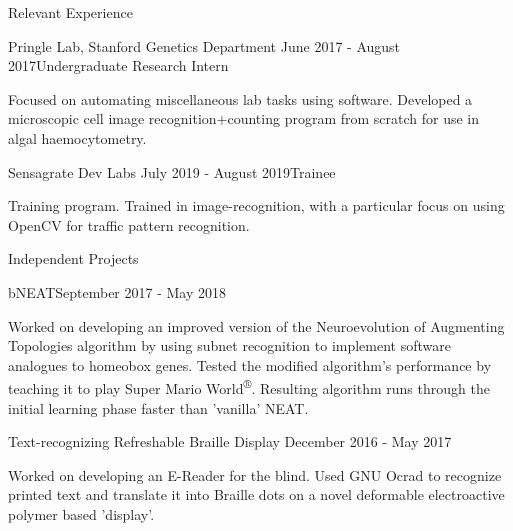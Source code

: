 \documentclass{resume} %
\begin{document}
\begin{resumeSection}{Relevant Experience}

\begin{resumeSubsection}{Pringle Lab, Stanford Genetics Department}
	{June 2017 - August 2017}{Undergraduate Research Intern}{}
\item Focused on automating miscellaneous lab tasks using software. Developed a 
	microscopic cell image recognition+counting program from scratch for
	use in algal haemocytometry.
\end{resumeSubsection}
\begin{resumeSubsection}{Sensagrate Dev Labs}
	{July 2019 - August 2019}{Trainee}{}
\item Training program. Trained in image-recognition, with a particular focus
	on using OpenCV for traffic pattern recognition.
\end{resumeSubsection}

\end{resumeSection}


\begin{resumeSection}{Independent Projects} \itemsep -2pt

\begin{resumeSubsection}{bNEAT}{September 2017 - May 2018}{}{}
\item Worked on developing an improved version of the Neuroevolution of
	Augmenting Topologies algorithm by using subnet recognition to
	implement software analogues to homeobox genes. Tested the modified
	algorithm's performance by teaching it to play Super Mario
	World\textsuperscript{®}. Resulting algorithm runs through the initial
	learning phase faster than 'vanilla' NEAT.
\end{resumeSubsection}
\begin{resumeSubsection}{Text-recognizing Refreshable Braille Display}
	{December 2016 - May 2017}{}{}
\item Worked on developing an E-Reader for the blind. Used GNU Ocrad to
	recognize printed text and translate it into Braille dots on a
	novel deformable electroactive polymer based 'display'. 
\end{resumeSubsection}

\end{resumeSection}
\end{document}

